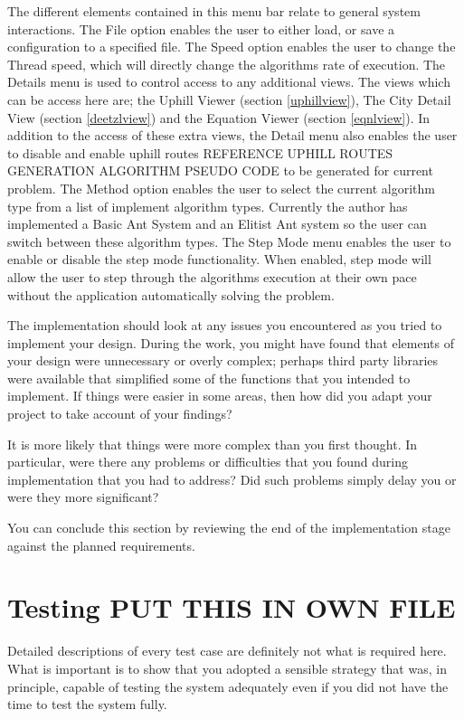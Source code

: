 The different elements contained in this menu bar relate to general system interactions. The File option enables the user to either load, or save a configuration to a specified file. The Speed option enables the user to change the Thread speed, which will directly change the algorithms rate of execution. The Details menu is used to control access to any additional views. The views which can be access here are; the Uphill Viewer (section \ref{uphillview}), The City Detail View (section \ref{deetzlview}) and the Equation Viewer (section \ref{eqnlview}). In addition to the access of these extra views, the Detail menu also enables the user to disable and enable uphill routes \Large REFERENCE UPHILL ROUTES GENERATION ALGORITHM PSEUDO CODE \normalsize to be generated for current problem. The Method option enables the user to select the current algorithm type from a list of implement algorithm types. Currently the author has implemented a Basic Ant System and an Elitist Ant system so the user can switch between these algorithm types. The Step Mode menu enables the user to enable or disable the step mode functionality. When enabled, step mode will allow the user to step through the algorithms execution at their own pace without the application automatically solving the problem.

The implementation should look at any issues you encountered as you tried to implement your design. During the work, you might have found that elements of your design were unnecessary or overly complex; perhaps third party libraries were available that simplified some of the functions that you intended to implement. If things were easier in some areas, then how did you adapt your project to take account of your findings?

It is more likely that things were more complex than you first thought. In particular, were there any problems or difficulties that you found during implementation that you had to address? Did such problems simply delay you or were they more significant? 

You can conclude this section by reviewing the end of the implementation stage against the planned requirements. 

\chapter{Testing PUT THIS IN OWN FILE}

Detailed descriptions of every test case are definitely not what is required here. What is important is to show that you adopted a sensible strategy that was, in principle, capable of testing the system adequately even if you did not have the time to test the system fully.

